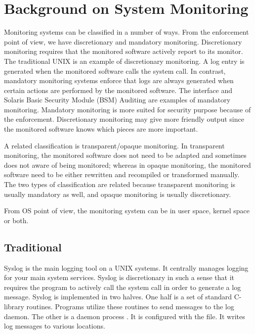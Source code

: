 \chapter{Background on System Monitoring}

Monitoring systems can be classified in a number of ways.
From the enforcement point of view, we have discretionary and
mandatory monitoring.
Discretionary monitoring requires that the monitored software
actively report to its monitor.
The traditional UNIX  is an example of discretionary monitoring.
A log entry is generated when the monitored software calls the 
system call.
In contrast, mandatory monitoring systems enforce that logs are always
generated when certain actions are performed by the monitored software.
The  interface and Solaris Basic Security Module (BSM) Auditing
are examples of mandatory monitoring.
Mandatory monitoring is more suited for security purpose because of the enforcement.
Discretionary monitoring may give more friendly output since the monitored
software knows which pieces are more important.

A related classification is transparent/opaque monitoring.
In transparent monitoring, the monitored software does not need to be adapted
and sometimes does not aware of being monitored;
whereas in opaque monitoring, the monitored software need to be either
rewritten and recompiled or transformed manually.
The two types of classification are related because transparent monitoring
is usually mandatory as well, and opaque monitoring is usually discretionary.

From OS point of view, the monitoring system can be in user space, kernel space
or both.

\section{Traditional }

Syslog is the main logging tool on a UNIX systems. It centrally manages logging
for your main system services. Syslog is discretionary in such a sense that it
requires the program to actively call the  system call in order to
generate a log message. Syslog is implemented in two halves. One half is a set
of standard C-library routines. Programs utilize these routines to send
messages to the log daemon. The other is a daemon process . It is
configured with the  file. It writes log messages to various
locations.

